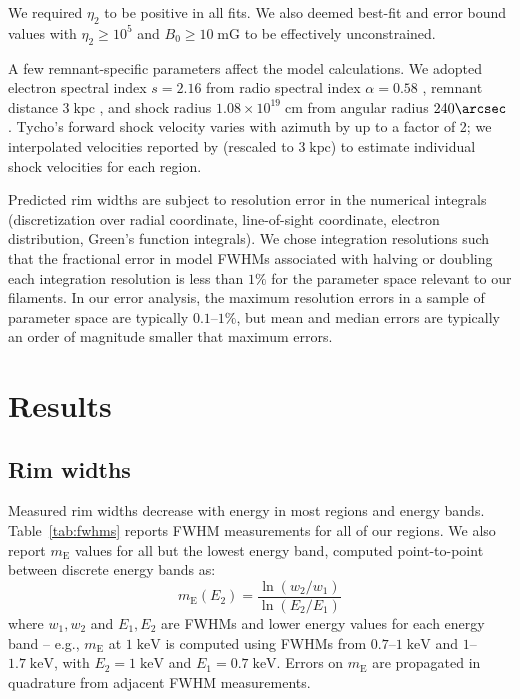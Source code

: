 \documentclass[manuscript]{aastex}  %
\newcommand*{\mt}{\mathrm}
\newcommand*{\unit}[1]{\;\mt{#1}}  %
\newcommand*{\mE}{m_\mt{E}}
\begin{document}
We required $\eta_2$ to be positive in all fits.  We also deemed
best-fit and error bound values with $\eta_2 \geq 10^5$ and $B_0 \geq 10
\unit{mG}$ to be effectively unconstrained. %

A few remnant-specific parameters affect the model calculations.  We adopted
electron spectral index $s = 2.16$ from radio spectral index $\alpha = 0.58$
\citep{sun2011}, remnant distance $3 \unit{kpc}$ \citep[cf.][]{hayato2010}, and
shock radius $1.08 \times 10^{19} \unit{cm}$ from angular radius $240\arcsec$
\citep{green2014}.  Tycho's forward shock velocity varies with azimuth by up to
a factor of 2; we interpolated velocities reported by \citet{williams2013}
(rescaled to $3 \unit{kpc}$) to estimate individual shock velocities for each
region.

Predicted rim widths are subject to resolution error in the numerical integrals
(discretization over radial coordinate, line-of-sight coordinate, electron
distribution, Green's function integrals).  We chose integration resolutions
such that the fractional error in model FWHMs associated with halving or
doubling each integration resolution is less than $1\%$ for the parameter space
relevant to our filaments.  In our error analysis, the maximum resolution
errors in a sample of parameter space are typically $0.1$--$1\%$, but mean and
median errors are typically an order of magnitude smaller that maximum errors.

\section{Results}

\subsection{Rim widths}
\label{sec:fwhm-results}

Measured rim widths decrease with energy in most regions and energy bands.
Table~\ref{tab:fwhms} reports FWHM measurements for all of our regions.
We also report $\mE$ values for all but the lowest energy band, computed
point-to-point between discrete energy bands as:
\begin{equation}
    \mE(E_2) = \frac{\ln(w_2/w_1)}{\ln(E_2/E_1)}
\end{equation}
where $w_1, w_2$ and $E_1, E_2$ are FWHMs and lower energy values for each
energy band -- e.g., $\mE$ at $1 \unit{keV}$ is computed using FWHMs from
$0.7$--$1 \unit{keV}$ and $1$--$1.7 \unit{keV}$, with $E_2 = 1 \unit{keV}$ and
$E_1 = 0.7 \unit{keV}$.  Errors on $\mE$ are propagated in quadrature from
adjacent FWHM measurements.
\end{document}
